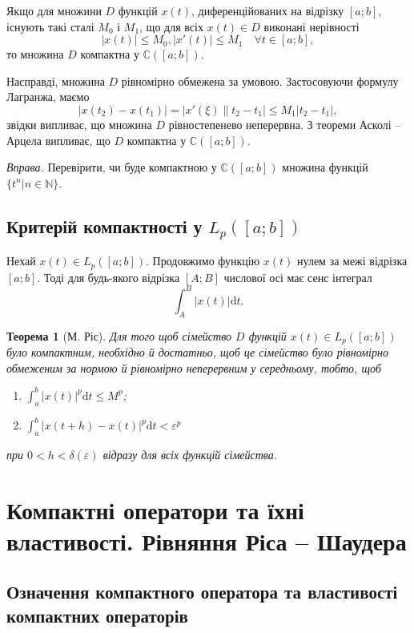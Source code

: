 \documentclass[14pt,twoside]{extreport}
\theoremstyle{mystyle}
\newtheorem{thm}{Теорема}
\numberwithin{equation}{chapter}
\newcommand{\cab}{\mathbb{C}([a; b])}
\begin{document}
Якщо для множини $D$ функцій $x(t)$, диференційованих на відрізку $[a; b]$, існують такі сталі $M_0$ і $M_1$, що для всіх $x(t) \in D$ виконані нерівності \[|x(t)| \leqslant M_0, |x'(t)|\leqslant M_1\quad \forall t \in [a; b],\]то множина $D$ компактна у $\cab$.

Насправді, множина $D$ рівномірно обмежена за умовою. Застосовуючи формулу Лагранжа, маємо
\[|x(t_2) - x(t_1)|=|x'(\xi)\|t_2 - t_1|\leqslant M_1 |t_2 - t_1|,\]
звідки випливає, що множина $D$ рівностепенево неперервна. З теореми Асколі -- Арцела випливає, що $D$ компактна у $\cab$.

\begin{small}
\emph{Вправа.} Перевірити, чи буде компактною у $\cab$ множина функцій $\{t^n|n\in\mathbb{N}\}$.
\end{small}

\section{Критерій компактності у \texorpdfstring{$L_p([a; b])$}{Lp([a;b])}}

Нехай $x(t) \in L_p([a; b])$. Продовжимо функцію $x(t)$ нулем за межі відрізка $[a; b]$. Тоді для будь-якого відрізка $[A; B]$ числової осі має сенс інтеграл
\[
\int_{A}^{B} |x(t)| \mathrm{d}t.
\]

\begin{thm}[М. Ріс]
	Для того щоб сімейство $D$ функцій $x(t) \in L_p([a;b])$ було компактним, необхідно й достатньо, щоб це сімейство було рівномірно обмеженим за нормою й рівномірно неперервним у середньому, тобто, щоб
	\begin{enumerate}
		\item $\int_{a}^{b} |x(t)|^p \mathrm{d}t \leqslant M^p$;
		\item $\int_{a}^{b} |x(t+h) - x(t)|^p \mathrm{d}t < \varepsilon^p$
	\end{enumerate}
	при $0 < h < \delta(\varepsilon)$ відразу для всіх функцій сімейства.
\end{thm}

\chapter{Компактні оператори та їхні властивості. Рівняння Ріса -- Шаудера}

\section{Означення компактного оператора та властивості компактних операторів}
\end{document}
